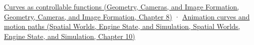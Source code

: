 \href{../03-Geometry-Cameras-and-Image-Formation/main.pdf\#nameddest=03-visual-computing-i-ch001-curves-as-controllable-functions}{Curves as controllable functions (Geometry, Cameras, and Image Formation, Geometry, Cameras, and Image Formation, Chapter 8)} · \href{../05-Spatial-Worlds-Engine-State-and-Simulation/main.pdf\#nameddest=04-visual-computing-ii-ch029-animation-curves-and-motion-paths}{Animation curves and motion paths (Spatial Worlds, Engine State, and Simulation, Spatial Worlds, Engine State, and Simulation, Chapter 10)}

